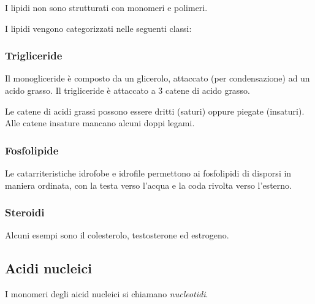 \documentclass[a4paper]{article}
\begin{document}
I lipidi non sono strutturati con monomeri e polimeri.

I lipidi vengono categorizzati nelle seguenti classi:

\subsubsection{Trigliceride}


Il monogliceride è composto da un glicerolo, attaccato (per condensazione) ad un acido grasso.
Il trigliceride è attaccato a 3 catene di acido grasso.

Le catene di acidi grassi possono essere dritti (saturi) oppure piegate (insaturi).
Alle catene insature mancano alcuni doppi legami.

\subsubsection{Fosfolipide}


Le catarriteristiche idrofobe e idrofile permettono ai fosfolipidi di disporsi in maniera ordinata,
con la testa verso l'acqua e la coda rivolta verso l'esterno.

\subsubsection{Steroidi}


Alcuni esempi sono il colesterolo, testosterone ed estrogeno.

\pagebreak

\subsection{Acidi nucleici}

I monomeri degli aicid nucleici si chiamano \textit{nucleotidi}.

\end{document}

